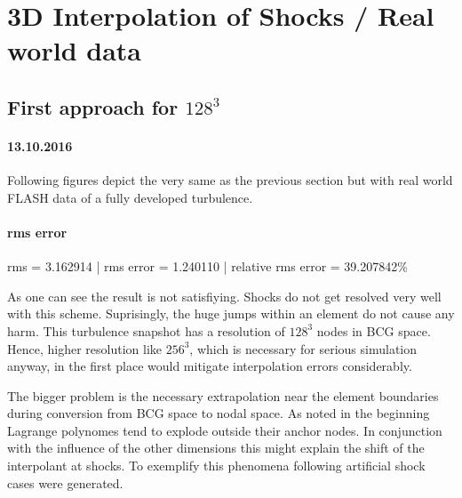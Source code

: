 \section{3D Interpolation of Shocks / Real world data}


\subsection{First approach for $128^3$}
\paragraph{13.10.2016}
Following figures depict the very same as the previous section but with real
world FLASH data of a fully developed turbulence.




\paragraph{rms error}
rms = 3.162914 | rms error = 1.240110 | relative rms error = 39.207842\%

As one can see the result is not satisfiying. Shocks do not get resolved very
well with this scheme. Suprisingly, the huge jumps within an element do not
cause any harm. This turbulence snapshot has a resolution of $128^3$ nodes in
BCG space. Hence, higher resolution like $256^3$, which is necessary for
serious simulation anyway, in the first place would mitigate interpolation
errors considerably.
 
The bigger problem is the necessary extrapolation near the element boundaries
during conversion from BCG space to nodal space. As noted in the beginning
Lagrange polynomes tend to explode outside their anchor nodes. In conjunction
with the influence of the other dimensions this might explain the shift of the
interpolant at shocks. To exemplify this phenomena following artificial shock
cases were generated.

